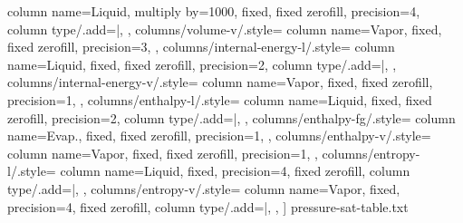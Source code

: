\documentclass{article}
\begin{document}
\begin{center}
{            column name={Liquid},
            multiply by={1000},
            fixed,
            fixed zerofill,
            precision=4,
            column type/.add={|}{},
        },
        columns/volume-v/.style={
            column name={Vapor},
            fixed,
            fixed zerofill,
            precision=3,
        },
        columns/internal-energy-l/.style={
            column name={Liquid},
            fixed,
            fixed zerofill,
            precision=2,
            column type/.add={|}{},
        },
        columns/internal-energy-v/.style={
            column name={Vapor},
            fixed,
            fixed zerofill,
            precision=1,
        },
        columns/enthalpy-l/.style={
            column name={Liquid},
            fixed,
            fixed zerofill,
            precision=2,
            column type/.add={|}{},
        },
        columns/enthalpy-fg/.style={
            column name={Evap.},
            fixed,
            fixed zerofill,
            precision=1,
        },
        columns/enthalpy-v/.style={
            column name={Vapor},
            fixed,
            fixed zerofill,
            precision=1,
        },
        columns/entropy-l/.style={
            column name={Liquid},
            fixed,
            precision=4,
            fixed zerofill,
            column type/.add={|}{},
        },
        columns/entropy-v/.style={
            column name={Vapor},
            fixed,
            precision=4,
            fixed zerofill,
            column type/.add={}{|},
        },
    ]
    {pressure-sat-table.txt}


\end{center}
\end{document}
